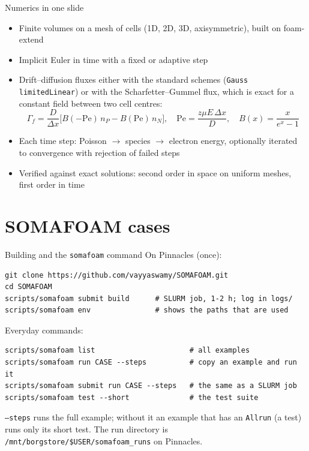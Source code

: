 \documentclass[aspectratio=169,11pt]{beamer}
\newcommand{\kw}[1]{\texttt{#1}}
\begin{document}
\begin{frame}{Numerics in one slide}
  \begin{itemize}
    \item Finite volumes on a mesh of cells (1D, 2D, 3D, axisymmetric), built on foam-extend
    \item Implicit Euler in time with a fixed or adaptive step
    \item Drift--diffusion fluxes either with the standard schemes (\kw{Gauss limitedLinear})
          or with the Scharfetter--Gummel flux, which is exact for a constant field between
          two cell centres:
          \begin{equation*}
            \Gamma_f=\frac{D}{\Delta x}\big[B(-\mathrm{Pe})\,n_P-B(\mathrm{Pe})\,n_N\big],\quad
            \mathrm{Pe}=\frac{z\mu E\,\Delta x}{D},\quad B(x)=\frac{x}{e^x-1}
          \end{equation*}
    \item Each time step: Poisson $\rightarrow$ species $\rightarrow$ electron energy,
          optionally iterated to convergence with rejection of failed steps
    \item Verified against exact solutions: second order in space on uniform meshes,
          first order in time
  \end{itemize}
\end{frame}

\section{SOMAFOAM cases}

\begin{frame}[fragile]{Building and the \kw{somafoam} command}
  On Pinnacles (once):
  \begin{lstlisting}
git clone https://github.com/vayyaswamy/SOMAFOAM.git
cd SOMAFOAM
scripts/somafoam submit build      # SLURM job, 1-2 h; log in logs/
scripts/somafoam env               # shows the paths that are used
  \end{lstlisting}
  Everyday commands:
  \begin{lstlisting}
scripts/somafoam list                      # all examples
scripts/somafoam run CASE --steps          # copy an example and run it
scripts/somafoam submit run CASE --steps   # the same as a SLURM job
scripts/somafoam test --short              # the test suite
  \end{lstlisting}
  \small \kw{--steps} runs the full example; without it an example that has an
  \kw{Allrun} (a test) runs only its short test. The run directory is
  \kw{/mnt/borgstore/\$USER/somafoam\_runs} on Pinnacles.
\end{frame}
\end{document}
